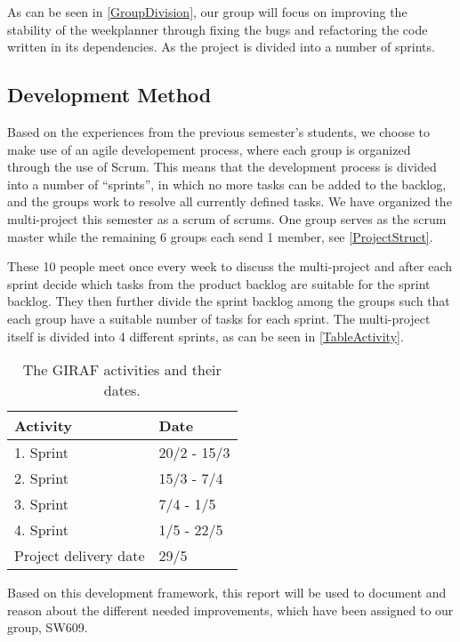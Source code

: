 As can be seen in \autoref{GroupDivision}, our group will focus
on improving the stability of the weekplanner through fixing the
bugs and refactoring the code written in its dependencies. As the project
is divided into a number of sprints.

\subsection{Development Method}

Based on the experiences from the previous semester's students, we choose to
make use of an agile developement process, where each group is organized through
the use of Scrum. This means that the development process is divided into a
number of ``sprints'', in which no more tasks can be added to the backlog, and
the groups work to resolve all currently defined tasks. We have organized the
multi-project this semester as a scrum of scrums. One group serves as the scrum
master while the remaining 6 groups each send 1 member, see
\autoref{ProjectStruct}.


These 10 people meet once every week to discuss the multi-project and after each
sprint decide which tasks from the product backlog are suitable for the sprint
backlog. They then further divide the sprint backlog among the groups such that
each group have a suitable number of tasks for each sprint. The multi-project
itself is divided into 4 different sprints, as can be seen in
\autoref{TableActivity}. 

\begin{table}[H]
\centering
\begin{tabular}{|l|l|}
\hline
Activity & Date \\ \hline
1. Sprint & 20/2 - 15/3 \\\hline 
2. Sprint & 15/3 - 7/4\\\hline 
3. Sprint & 7/4 - 1/5\\\hline 
4. Sprint & 1/5 - 22/5\\\hline 
Project delivery date & 29/5\\\hline
\end{tabular}
\caption{The GIRAF activities and their dates.}
\label{TableActivity}
\end{table}

Based on this development framework, this report will be used to document and
reason about the different needed improvements, which have been assigned to our
group, SW609.